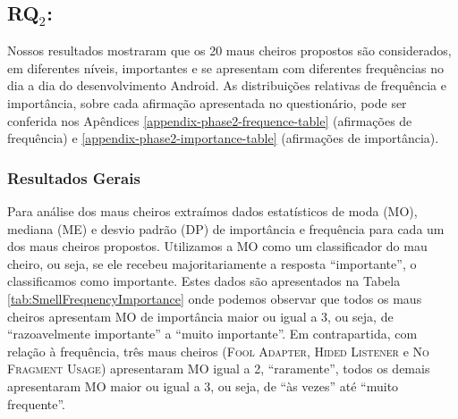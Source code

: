 \subsection{RQ$_2$: \rqtwo}
\label{phase2-results}


Nossos resultados mostraram que os 20 maus cheiros propostos são considerados, em diferentes níveis, importantes e se apresentam com diferentes frequências no dia a dia do desenvolvimento Android. As distribuições relativas de frequência e importância, sobre cada afirmação apresentada no questionário, pode ser conferida nos Apêndices \ref{appendix-phase2-frequence-table} (afirmações de frequência) e \ref{appendix-phase2-importance-table} (afirmações de importância).


\subsubsection{Resultados Gerais}
\label{phase2-general-results}

Para análise dos maus cheiros extraímos dados estatísticos de moda (MO), mediana (ME) e desvio padrão (DP) de importância e frequência para cada um dos maus cheiros propostos. Utilizamos a MO como um classificador do mau cheiro, ou seja, se ele recebeu majoritariamente a resposta ``importante'', o classificamos como importante. Estes dados são apresentados na Tabela \ref{tab:SmellFrequencyImportance} onde podemos observar que todos os maus cheiros apresentam MO de importância maior ou igual a 3, ou seja, de ``razoavelmente importante'' a ``muito importante''. Em contrapartida, com relação à frequência, três maus cheiros (\textsc{\small Fool Adapter}, \textsc{\small Hided Listener} e \textsc{\small No Fragment Usage}) apresentaram MO igual a 2, ``raramente'', todos os demais apresentaram MO maior ou igual a 3, ou seja, de ``às vezes'' até ``muito frequente''.

